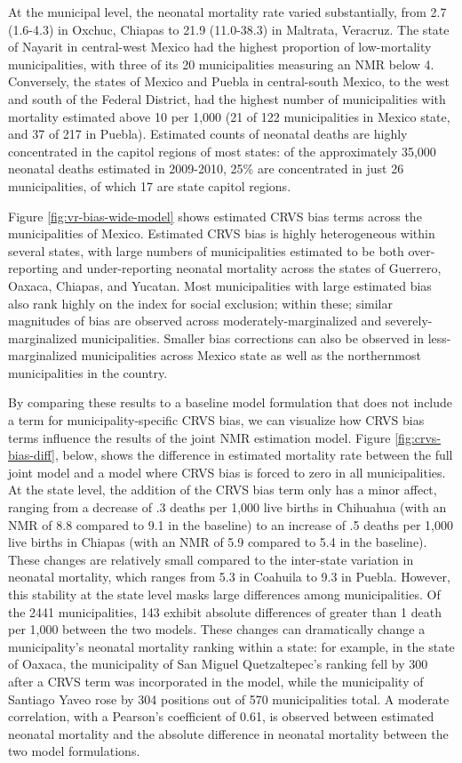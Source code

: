 \documentclass[
]{article}
\begin{document}
At the municipal level, the neonatal mortality rate varied substantially, from 2.7 (1.6-4.3) in Oxchuc, Chiapas to 21.9 (11.0-38.3) in Maltrata, Veracruz. The state of Nayarit in central-west Mexico had the highest proportion of low-mortality municipalities, with three of its 20 municipalities measuring an NMR below 4. Conversely, the states of Mexico and Puebla in central-south Mexico, to the west and south of the Federal District, had the highest number of municipalities with mortality estimated above 10 per 1,000 (21 of 122 municipalities in Mexico state, and 37 of 217 in Puebla). Estimated counts of neonatal deaths are highly concentrated in the capitol regions of most states: of the approximately 35,000 neonatal deaths estimated in 2009-2010, 25\% are concentrated in just 26 municipalities, of which 17 are state capitol regions.

Figure \ref{fig:vr-bias-wide-model} shows estimated CRVS bias terms across the municipalities of Mexico. Estimated CRVS bias is highly heterogeneous within several states, with large numbers of municipalities estimated to be both over-reporting and under-reporting neonatal mortality across the states of Guerrero, Oaxaca, Chiapas, and Yucatan. Most municipalities with large estimated bias also rank highly on the index for social exclusion; within these; similar magnitudes of bias are observed across moderately-marginalized and severely-marginalized municipalities. Smaller bias corrections can also be observed in less-marginalized municipalities across Mexico state as well as the northernmost municipalities in the country.

By comparing these results to a baseline model formulation that does not include a term for municipality-specific CRVS bias, we can visualize how CRVS bias terms influence the results of the joint NMR estimation model. Figure \ref{fig:crvs-bias-diff}, below, shows the difference in estimated mortality rate between the full joint model and a model where CRVS bias is forced to zero in all municipalities. At the state level, the addition of the CRVS bias term only has a minor affect, ranging from a decrease of .3 deaths per 1,000 live births in Chihuahua (with an NMR of 8.8 compared to 9.1 in the baseline) to an increase of .5 deaths per 1,000 live births in Chiapas (with an NMR of 5.9 compared to 5.4 in the baseline). These changes are relatively small compared to the inter-state variation in neonatal mortality, which ranges from 5.3 in Coahuila to 9.3 in Puebla. However, this stability at the state level masks large differences among municipalities. Of the 2441 municipalities, 143 exhibit absolute differences of greater than 1 death per 1,000 between the two models. These changes can dramatically change a municipality's neonatal mortality ranking within a state: for example, in the state of Oaxaca, the municipality of San Miguel Quetzaltepec's ranking fell by 300 after a CRVS term was incorporated in the model, while the municipality of Santiago Yaveo rose by 304 positions out of 570 municipalities total. A moderate correlation, with a Pearson's coefficient of 0.61, is observed between estimated neonatal mortality and the absolute difference in neonatal mortality between the two model formulations.
\end{document}

